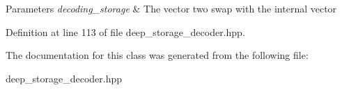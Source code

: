 \begin{DoxyParams}{Parameters}
{\em decoding\-\_\-storage} & The vector two swap with the internal vector \\
\hline
\end{DoxyParams}


Definition at line 113 of file deep\-\_\-storage\-\_\-decoder.\-hpp.



The documentation for this class was generated from the following file\-:\begin{DoxyCompactItemize}
\item 
deep\-\_\-storage\-\_\-decoder.\-hpp\end{DoxyCompactItemize}
